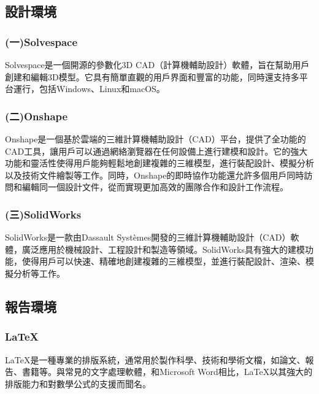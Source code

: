 \subsection{設計環境}
\subsubsection{(一)Solvespace}
\fontsize{14pt}{2.5pt}\sectionef\hspace{12pt}
Solvespace是一個開源的參數化3D CAD（計算機輔助設計）軟體，旨在幫助用戶創建和編輯3D模型。它具有簡單直觀的用戶界面和豐富的功能，同時還支持多平台運行，包括Windows、Linux和macOS。\\
\subsubsection{(二)Onshape}
\fontsize{14pt}{2.5pt}\sectionef\hspace{12pt}
Onshape是一個基於雲端的三維計算機輔助設計（CAD）平台，提供了全功能的CAD工具，讓用戶可以通過網絡瀏覽器在任何設備上進行建模和設計。它的強大功能和靈活性使得用戶能夠輕鬆地創建複雜的三維模型，進行裝配設計、模擬分析以及技術文件繪製等工作。同時，Onshape的即時協作功能還允許多個用戶同時訪問和編輯同一個設計文件，從而實現更加高效的團隊合作和設計工作流程。\\
\subsubsection{(三)SolidWorks}
\fontsize{14pt}{2.5pt}\sectionef\hspace{12pt}
SolidWorks是一款由Dassault Systèmes開發的三維計算機輔助設計（CAD）軟體，廣泛應用於機械設計、工程設計和製造等領域。SolidWorks具有強大的建模功能，使得用戶可以快速、精確地創建複雜的三維模型，並進行裝配設計、渲染、模擬分析等工作。\\
\subsection{報告環境}
\fontsize{14pt}{2.5pt}\sectionef\hspace{12pt}
\subsubsection{LaTeX}
\fontsize{14pt}{2.5pt}\sectionef\hspace{12pt}
LaTeX是一種專業的排版系統，通常用於製作科學、技術和學術文檔，如論文、報告、書籍等。與常見的文字處理軟體，和Microsoft Word相比，LaTeX以其強大的排版能力和對數學公式的支援而聞名。

\newpage

\renewcommand{\baselinestretch}{0.5} %